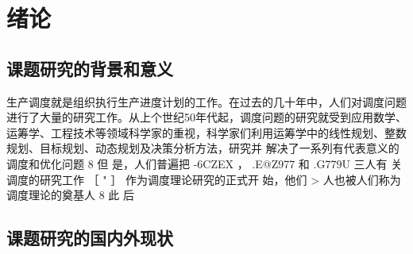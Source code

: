 \chapter{绪论}
\section{课题研究的背景和意义}
生产调度就是组织执行生产进度计划的工作。在过去的几十年中，人们对调度问题进行了大量的研究工作。从上个世纪50年代起，调度问题的研究就受到应用数学、运筹学、工程技术等领域科学家的重视，科学家们利用运筹学中的线性规划、整数规划、目标规划、动态规划及决策分析方法，研究并
解决了一系列有代表意义的调度和优化问题 8 但
是，人们普遍把 -6CZEX ，
.E@Z977 和 .G779U 三人有
关调度的研究工作
［ " ］ 作为调度理论研究的正式开
始，他们 > 人也被人们称为调度理论的奠基人 8 此\cite{徐俊刚2004生产调度理论和方法研究综述}
后
\section{课题研究的国内外现状}
